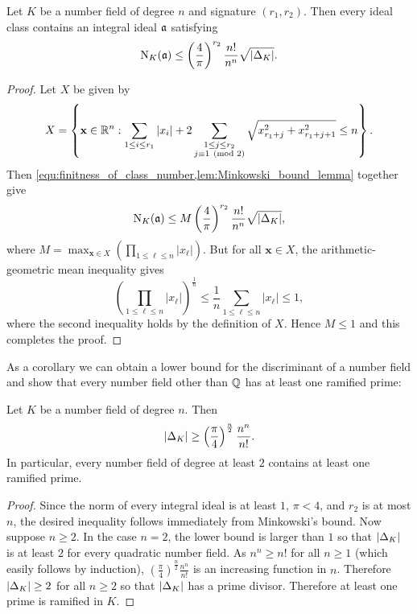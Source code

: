     \begin{theorem*}
      Let $K$ be a number field of degree $n$ and signature $(r_{1},r_{2})$. Then every ideal class contains an integral ideal $\mathfrak{a}$ satisfying
      \[
        \operatorname{\mathrm{N}}_{K}(\mathfrak{a}) \le \left(\frac{4}{\pi}\right)^{r_{2}}\frac{n!}{n^{n}}\sqrt{|\Delta_{K}|}.
      \]
    \end{theorem*}
    \begin{proof}
      Let $X$ be given by
      \[
        X = \left\{\mathbf{x} \in \mathbb{R}^{n}:\sum_{1 \le i \le r_{1}}|x_{i}|+2\sum_{\substack{1 \le j \le r_{2} \\ j \equiv 1 \ \left(\text{mod }2\right)}}\sqrt{x_{r_{1}+j}^{2}+x_{r_{1}+j+1}^{2}} \le n\right\}.
      \]
      Then \cref{equ:finitness_of_class_number,lem:Minkowski_bound_lemma} together give
      \[
        \operatorname{\mathrm{N}}_{K}(\mathfrak{a}) \le M\left(\frac{4}{\pi}\right)^{r_{2}}\frac{n!}{n^{n}}\sqrt{|\Delta_{K}|},
      \]
      where $M = \max_{\mathbf{x} \in X}\left(\prod_{1 \le \ell \le n}|x_{\ell}|\right)$. But for all $\mathbf{x} \in X$, the arithmetic-geometric mean inequality gives
      \[
        \left(\prod_{1 \le \ell \le n}|x_{\ell}|\right)^{\frac{1}{n}} \le \frac{1}{n}\sum_{1 \le \ell \le n}|x_{\ell}| \le 1,
      \]
      where the second inequality holds by the definition of $X$. Hence $M \le 1$ and this completes the proof.
    \end{proof}

    As a corollary we can obtain a lower bound for the discriminant of a number field and show that every number field other than $\mathbb{Q}$ has at least one ramified prime:

    \begin{corollary}
      Let $K$ be a number field of degree $n$. Then
      \[
        |\Delta_{K}| \ge \left(\frac{\pi}{4}\right)^{\frac{n}{2}}\frac{n^{n}}{n!}.
      \]
      In particular, every number field of degree at least $2$ contains at least one ramified prime.
    \end{corollary}
    \begin{proof}
      Since the norm of every integral ideal is at least $1$, $\pi < 4$, and $r_{2}$ is at most $n$, the desired inequality follows immediately from Minkowski's bound. Now suppose $n \ge 2$. In the case $n = 2$, the lower bound is larger than $1$ so that $|\Delta_{K}|$ is at least $2$ for every quadratic number field. As $n^{n} \ge n!$ for all $n \ge 1$ (which easily follows by induction), $\left(\frac{\pi}{4}\right)^{\frac{n}{2}}\frac{n^{n}}{n!}$ is an increasing function in $n$. Therefore $|\Delta_{K}| \ge 2$ for all $n \ge 2$ so that $|\Delta_{K}|$ has a prime divisor. Therefore at least one prime is ramified in $K$.
    \end{proof}

